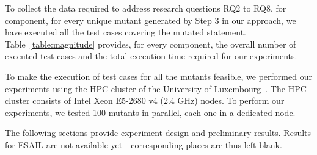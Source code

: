  {To collect the data required to address research questions RQ2 to RQ8, for component, for every unique mutant generated by Step 3 in our approach, we have executed all the test cases covering the mutated statement. Table~\ref{table:magnitude} provides, for every component, the overall number of executed test cases and the total execution time required for our experiments. 
 } 

To make the execution of test cases for all the mutants feasible, we performed our experiments using the HPC cluster of the University of Luxembourg~\cite{HPC}.
The HPC cluster consists of Intel Xeon E5-2680 v4 (2.4 GHz) nodes. To perform our experiments, we tested 100 mutants in parallel, each one in a dedicated node.

The following sections provide experiment design and preliminary results. Results for ESAIL are not available yet - corresponding places are thus left blank.



% 







%

